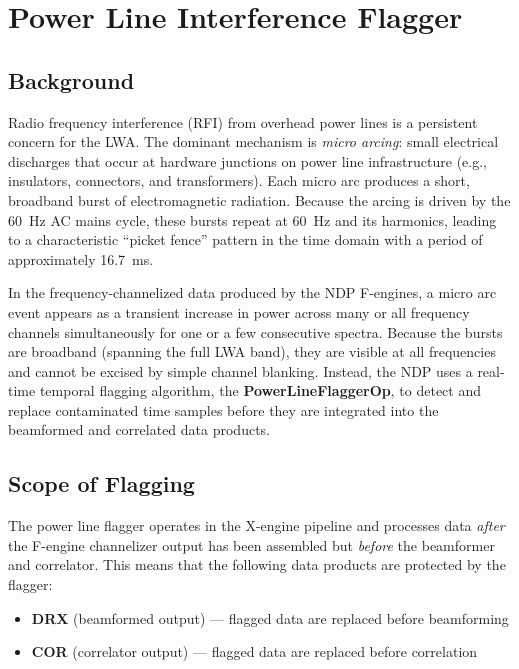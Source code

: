 
\chapter{Power Line Interference Flagger}
\label{app:powerline}

\section{Background}

Radio frequency interference (RFI) from overhead power lines is a persistent concern for the LWA. The dominant mechanism is \emph{micro arcing}: small electrical discharges that occur at hardware junctions on power line infrastructure (e.g., insulators, connectors, and transformers). Each micro arc produces a short, broadband burst of electromagnetic radiation. Because the arcing is driven by the 60~Hz AC mains cycle, these bursts repeat at 60~Hz and its harmonics, leading to a characteristic ``picket fence'' pattern in the time domain with a period of approximately 16.7~ms.

In the frequency-channelized data produced by the NDP F-engines, a micro arc event appears as a transient increase in power across many or all frequency channels simultaneously for one or a few consecutive spectra. Because the bursts are broadband (spanning the full LWA band), they are visible at all frequencies and cannot be excised by simple channel blanking. Instead, the NDP uses a real-time temporal flagging algorithm, the \textbf{PowerLineFlaggerOp}, to detect and replace contaminated time samples before they are integrated into the beamformed and correlated data products.

\section{Scope of Flagging}

The power line flagger operates in the X-engine pipeline and processes data \emph{after} the F-engine channelizer output has been assembled but \emph{before} the beamformer and correlator. This means that the following data products are protected by the flagger:

\begin{itemize}
    \item \textbf{DRX} (beamformed output) --- flagged data are replaced before beamforming
    \item \textbf{COR} (correlator output) --- flagged data are replaced before correlation
\end{itemize}

